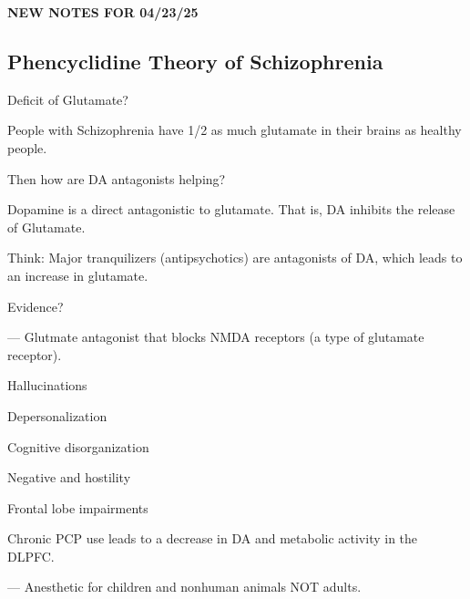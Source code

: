 \begin{center}
    \textbf{NEW NOTES FOR 04/23/25} \\
    \hrulefill
\end{center}

\subsection{Phencyclidine Theory of Schizophrenia}

\begin{coloredlist}
    \item Deficit of Glutamate?
    \begin{coloredlist}
        \item People with Schizophrenia have 1/2 as much glutamate in their brains as healthy people.
        \item Then how are DA antagonists helping?
        \begin{coloredlist}
            \item Dopamine is a direct antagonistic to glutamate. That is, DA inhibits the release of Glutamate.
            \item Think: Major tranquilizers (antipsychotics) are antagonists of DA, which leads to an increase in glutamate.
        \end{coloredlist}
    \end{coloredlist}
    \item Evidence?
    \begin{coloredlist}
        \item {} — Glutmate antagonist that blocks NMDA receptors (a type of glutamate receptor).
        \begin{multicols}{2}
            \begin{coloredlist}
                \item Hallucinations
                \item Depersonalization
                \item Cognitive disorganization
                \item Negative and hostility
                \item Frontal lobe impairments
            \end{coloredlist}
        \end{multicols}
        \item Chronic PCP use leads to a decrease in DA and metabolic activity in the DLPFC.
        \item {} — Anesthetic for children and nonhuman animals NOT adults.

\end{coloredlist}
\end{coloredlist}

